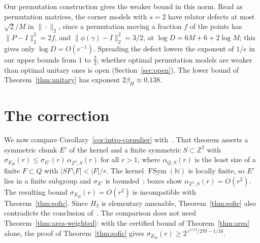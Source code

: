 \documentclass[11pt,a4paper]{article}
\theoremstyle{plain}
\theoremstyle{definition}
\theoremstyle{remark}
\DeclareMathOperator{\FSym}{FSym}
\begin{document}
Our permutation construction gives the weaker bound in this norm. Read as permutation matrices, the corner models with $s=2$ have relator
defects at most
$\sqrt2/M$ in $\|\cdot\|_2$, since a permutation moving a fraction $f$ of the points has $\|P-I\|_2^2=2f$, and $\|\phi(\gamma)-I\|_2^2=3/2$, at
$\log D=6M+6+2\log M$; this gives only $\log D=O(e^{-1})$. Spreading the defect lowers the exponent of $1/e$ in our upper bounds from $1$ to
$\frac23$; whether optimal permutation models are weaker than optimal unitary ones is open (Section~\ref{sec:open}). The lower
bound of Theorem~\ref{thm:unitary} has exponent $2\beta_H\approx0.138$.

\section{The correction}\label{sec:correction}

We now compare Corollary~\ref{cor:intro-cornulier} with~\cite[Theorem~3.15]{Cornulier2013}. That theorem
asserts a symmetric chunk $E'$ of the kernel and a finite symmetric $S\subset\mathbb{Z}^2$ with
$\sigma_{E_H}(r)\le\sigma_{E'}(r)\,\alpha_{\mathbb{Z}^2,S}(r)$ for all $r>1$, where $\alpha_{Q,S}(r)$ is the least size of a finite
$F\subset Q$ with $|SF\setminus F|<|F|/r$. The kernel $\FSym(\mathbb{N})$ is locally finite, so $E'$ lies in a finite subgroup and
$\sigma_{E'}$ is bounded~\cite[Fact~3.5]{Cornulier2013}; boxes show $\alpha_{\mathbb{Z}^2,S}(r)=O(r^2)$. The resulting bound
$\sigma_{E_H}(r)=O(r^2)$ is incompatible with Theorem~\ref{thm:sofic}. Since $H_3$ is elementary amenable, Theorem~\ref{thm:sofic} also
contradicts the conclusion of~\cite[Example~3.16]{Cornulier2013}. The comparison does not need Theorem~\ref{thm:area-weighted}: with the certified bound of
Theorem~\ref{thm:area} alone, the proof of Theorem~\ref{thm:sofic} gives $\sigma_{E_H}(r)\ge2^{\,r^{1/12}/270-1/16}$.
\end{document}
